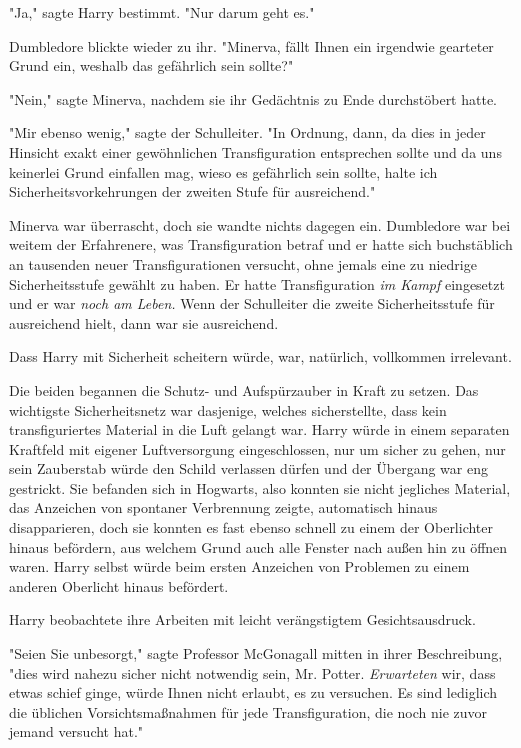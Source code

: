 {"Ja," sagte Harry bestimmt. "Nur darum geht es."

Dumbledore blickte wieder zu ihr. "Minerva, fällt Ihnen ein irgendwie gearteter Grund ein, weshalb das gefährlich sein sollte?"

"Nein," sagte Minerva, nachdem sie ihr Gedächtnis zu Ende durchstöbert hatte.

"Mir ebenso wenig," sagte der Schulleiter. "In Ordnung, dann, da dies in jeder Hinsicht exakt einer gewöhnlichen Transfiguration entsprechen sollte und da uns keinerlei Grund einfallen mag, wieso es gefährlich sein sollte, halte ich Sicherheitsvorkehrungen der zweiten Stufe für ausreichend."

Minerva war überrascht, doch sie wandte nichts dagegen ein. Dumbledore war bei weitem der Erfahrenere, was Transfiguration betraf und er hatte sich buchstäblich an tausenden neuer Transfigurationen versucht, ohne jemals eine zu niedrige Sicherheitsstufe gewählt zu haben. Er hatte Transfiguration \emph{im Kampf} eingesetzt und er war \emph{noch am Leben.} Wenn der Schulleiter die zweite Sicherheitsstufe für ausreichend hielt, dann war sie ausreichend.

Dass Harry mit Sicherheit scheitern würde, war, natürlich, vollkommen irrelevant.

Die beiden begannen die Schutz- und Aufspürzauber in Kraft zu setzen. Das wichtigste Sicherheitsnetz war dasjenige, welches sicherstellte, dass kein transfiguriertes Material in die Luft gelangt war. Harry würde in einem separaten Kraftfeld mit eigener Luftversorgung eingeschlossen, nur um sicher zu gehen, nur sein Zauberstab würde den Schild verlassen dürfen und der Übergang war eng gestrickt. Sie befanden sich in Hogwarts, also konnten sie nicht jegliches Material, das Anzeichen von spontaner Verbrennung zeigte, automatisch hinaus disapparieren, doch sie konnten es fast ebenso schnell zu einem der Oberlichter hinaus befördern, aus welchem Grund auch alle Fenster nach außen hin zu öffnen waren. Harry selbst würde beim ersten Anzeichen von Problemen zu einem anderen Oberlicht hinaus befördert.

Harry beobachtete ihre Arbeiten mit leicht verängstigtem Gesichtsausdruck.

"Seien Sie unbesorgt," sagte Professor McGonagall mitten in ihrer Beschreibung, "dies wird nahezu sicher nicht notwendig sein, Mr. Potter. \emph{Erwarteten} wir, dass etwas schief ginge, würde Ihnen nicht erlaubt, es zu versuchen. Es sind lediglich die üblichen Vorsichtsmaßnahmen für jede Transfiguration, die noch nie zuvor jemand versucht hat."

}
